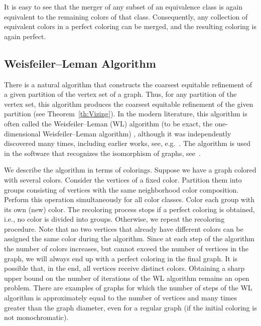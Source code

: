 \documentclass[11pt]{article}
\theoremstyle{definition}
\begin{document}
It is easy to see that the merger of any subset of an equivalence class is again equivalent to the remaining colors of that class. Consequently, any collection of equivalent colors in a perfect coloring can be merged, and the resulting coloring is again perfect.



\subsection{Weisfeiler--Leman Algorithm}\label{Vizing}



There is a natural algorithm that constructs the coarsest equitable refinement 
of a given partition of the vertex set of a graph. 
Thus, for any partition of the vertex set, this algorithm produces the coarsest equitable refinement of the given partition (see Theorem~\ref{th:Vizing}).
In the modern literature, this algorithm is often 
called the Weisfeiler--Leman (WL) algorithm (to be exact, the one-dimensional  Weisfeiler--Leman algorithm) \cite{WL:68}, although it was independently discovered many times, including earlier works, see, e.g.~\cite{Morgan:65}.
The algorithm is used in the software that 
recognizes the isomorphism of graphs, see~\cite{McKay:80}.

We describe the algorithm in terms of colorings.
 Suppose we have a graph colored with several colors.
Consider the vertices of a fixed color.
Partition them into groups consisting of vertices with the same neighborhood color composition.
Perform this operation simultaneously for all color classes. Color each group with its own (new)
color.  The
recoloring process stops if a perfect coloring is obtained,
i.e., no color is divided into groups. Otherwise, we repeat
the recoloring procedure.
 Note that no two vertices that already have different colors can be assigned the same color during the algorithm.
 Since at each step of the algorithm the number
of colors increases, but cannot exceed the number of vertices in the graph,
we will always end up with a perfect coloring in the final
graph.
It is possible that, in the end, all vertices receive distinct colors.
Obtaining a sharp upper bound on the number of iterations of the WL algorithm remains an open problem.
There are examples of graphs for which the number of steps of the WL algorithm is approximately equal to the number of vertices and many times greater than the graph diameter, even for a regular graph (if the initial coloring is not monochromatic). \label{WLprob}
\end{document}
